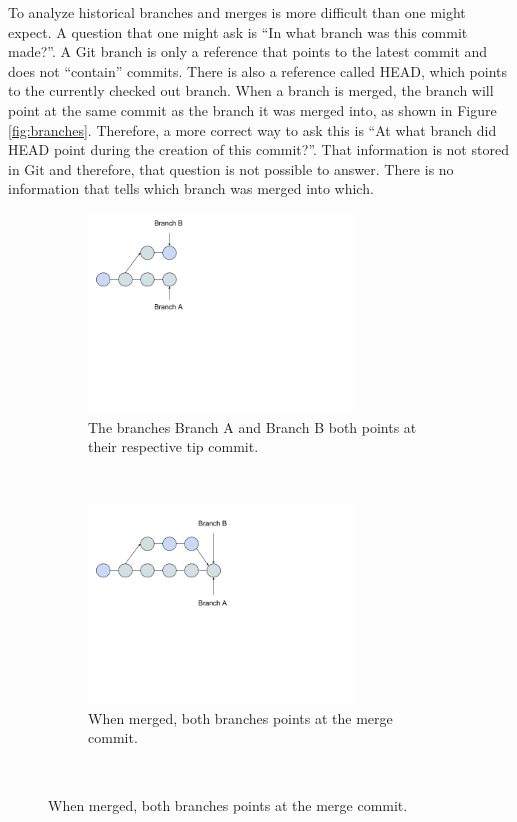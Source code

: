 To analyze historical branches and merges is more difficult than one might expect. A question that one might ask is “In what branch was this commit made?”. A Git branch is only a reference that points to the latest commit and does not “contain” commits. There is also a reference called HEAD, which points to the currently checked out branch. When a branch is merged, the branch will point at the same commit as the branch it was merged into, as shown in Figure \ref{fig:branches}. Therefore, a more correct way to ask this is “At what branch did HEAD point during the creation of this commit?”. That information is not stored in Git and therefore, that question is not possible to answer. There is no information that tells which branch was merged into which.
\begin{figure}
\centering
\begin{subfigure}[b]{0.3\textwidth}
   \includegraphics[width=200pt]{figure/branch1.png}
   \caption{The branches Branch A and Branch B both points at their respective tip commit.}
   \label{fig:mbranch1}
\end{subfigure}
~ %
\begin{subfigure}[b]{0.3\textwidth}
   \includegraphics[width=200pt]{figure/branch2.png}
   \caption{When merged, both branches points at the merge commit.}
   \label{fig:mbranch2}
\end{subfigure}
~ %

\end{figure}
